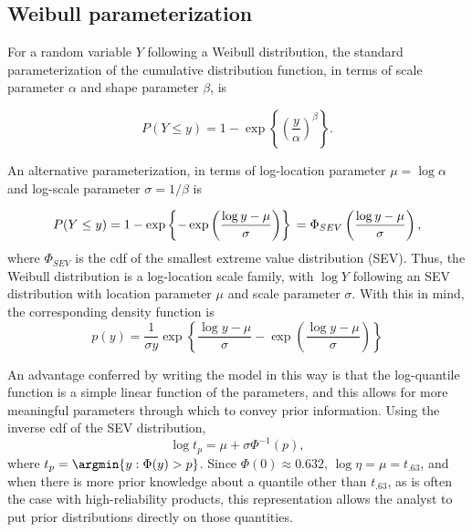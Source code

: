 \documentclass[12pt]{article}
\begin{document}
\subsection{Weibull parameterization}
\label{sec:Weibull parameterization}
For a random variable $Y$ following a Weibull distribution, the standard parameterization of the cumulative distribution function, in terms of scale parameter $\alpha$ and shape parameter $\beta$, is

$$ P(Y \le y) = 1 - \exp \left\{ \left( \frac{y}{\alpha} \right)^\beta \right\}. $$

An alternative parameterization, in terms of log-location parameter $\mu = \log \alpha$ and log-scale parameter $\sigma = 1/\beta$ is

\begin{equation} P(Y \le y) = 1 - \exp \left\{ -\exp \left( \frac{ \log y - \mu }{\sigma} \right) \right\}\\
= \Phi_{SEV}\left(\frac{\log y - \mu}{\sigma}\right),
\end{equation}
where $\Phi_{SEV}$ is the cdf of the smallest extreme value distribution (SEV). Thus, the Weibull distribution is a log-location scale family, with $\log Y$ following an SEV distribution with location parameter $\mu$ and scale parameter $\sigma$. With this in mind, the corresponding density function is
\begin{equation}
p(y) = \frac{1}{\sigma y}\exp\left\{\frac{\log y - \mu}{\sigma} - \exp \left( \frac{\log y - \mu}{\sigma} \right)\right\}
\end{equation}

An advantage conferred by writing the model in this way is that the log-quantile function is a simple linear function of the parameters, and this allows for more meaningful parameters through which to convey prior information.  Using the inverse cdf of the SEV distribution,
\begin{equation}
\log t_p = \mu + \sigma \Phi^{-1}(p),
\end{equation}
where $t_p = \argmin\{y:\Phi(y)>p\}$. Since $\Phi(0)\approx 0.632$, $\log{\eta} = \mu  =t_{.63}$, and when there is more prior knowledge about a quantile other than $t_{.63}$, as is often the case with high-reliability products,  this representation allows the analyst to put prior distributions directly on those quantities.
\end{document}
